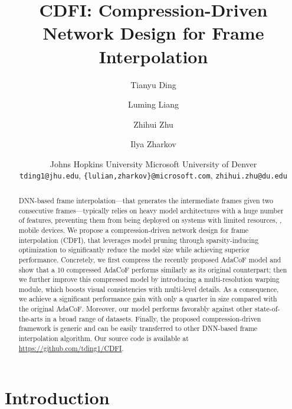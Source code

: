 \documentclass[final]{cvpr}
\begin{document}
\title{\bf \Large CDFI: Compression-Driven Network Design for Frame Interpolation\vspace{.2in}}


\author{Tianyu Ding
\and
Luming Liang
\and
Zhihui Zhu
\and
Ilya Zharkov
}

\date{Johns Hopkins University \qquad  Microsoft \qquad University of Denver\\
{\tt\small tding1@jhu.edu},
{\tt\small \{lulian,zharkov\}@microsoft.com},
{\tt\small zhihui.zhu@du.edu}
}



\maketitle


\begin{abstract}








DNN-based frame interpolation---that generates the intermediate frames given two consecutive frames---typically relies on heavy model architectures with a huge number of features, preventing them from being deployed on systems with limited resources, \eg, mobile devices. 
We propose a compression-driven network design for frame interpolation (CDFI), that leverages model pruning through sparsity-inducing optimization to significantly reduce the model size while achieving superior performance. Concretely, we first compress the recently proposed AdaCoF model and show that a 10 compressed AdaCoF performs similarly as its original counterpart; then we further improve this compressed model by introducing a multi-resolution warping module, which boosts visual consistencies with multi-level details. As a consequence, we achieve a significant performance gain with only a quarter in size compared with the original AdaCoF. Moreover, our model performs favorably against other state-of-the-arts in a broad range of datasets. Finally, the proposed compression-driven framework is generic and can be easily transferred to other DNN-based frame interpolation algorithm. Our source code is available at \url{https://github.com/tding1/CDFI}.

\end{abstract}

\section{Introduction}
\end{document}
